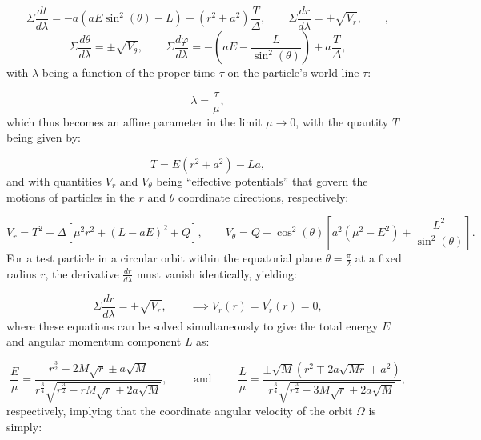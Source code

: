 \documentclass{article}
\begin{document}
\begin{equation}
\Sigma \frac{d t}{d \lambda} = -a \left( a E \sin^2 \left( \theta \right) - L \right) + \left( r^2 + a^2 \right) \frac{T}{\Delta}, \qquad \Sigma \frac{d r}{d \lambda} = \pm \sqrt{V_r}, \qquad,
\end{equation}
\begin{equation}
\Sigma \frac{d \theta}{d \lambda} = \pm \sqrt{V_{\theta}}, \qquad \Sigma \frac{d \varphi}{d \lambda} = - \left( a E - \frac{L}{\sin^2 \left( \theta \right)} \right) + a \frac{T}{\Delta},
\end{equation}
with ${\lambda}$ being a function of the proper time ${\tau}$ on the particle's world line ${\tau}$:

\begin{equation}
\lambda = \frac{\tau}{\mu},
\end{equation}
which thus becomes an affine parameter in the limit ${\mu \to 0}$, with the quantity $T$ being given by:

\begin{equation}
T = E \left( r^2 + a^2 \right) - L a,
\end{equation}
and with quantities ${V_r}$ and ${V_{\theta}}$ being ``effective potentials'' that govern the motions of particles in the $r$ and ${\theta}$ coordinate directions, respectively:

\begin{equation}
V_r = T^2 - \Delta \left[ \mu^2 r^2 + \left( L - a E \right)^2 + Q \right], \qquad V_{\theta} = Q - \cos^2 \left( \theta \right) \left[ a^2 \left( \mu^2 - E^2 \right) + \frac{L^2}{\sin^2 \left( \theta \right)} \right].
\end{equation}
For a test particle in a circular orbit within the equatorial plane ${\theta = \frac{\pi}{2}}$ at a fixed radius $r$, the derivative ${\frac{dr}{d \lambda}}$ must vanish identically, yielding:

\begin{equation}
\Sigma \frac{dr}{d \lambda} = \pm \sqrt{V_r}, \qquad \implies V_r \left( r \right) = V_{r}^{\prime} \left( r \right) = 0,
\end{equation}
where these equations can be solved simultaneously to give the total energy $E$ and angular momentum component $L$ as:

\begin{equation}
\frac{E}{\mu} = \frac{r^{\frac{3}{2}} - 2 M \sqrt{r} \pm a \sqrt{M}}{r^{\frac{3}{4}} \sqrt{r^{\frac{3}{2}} - r M \sqrt{r} \pm 2 a \sqrt{M}}}, \qquad \text{ and } \qquad \frac{L}{\mu} = \frac{\pm \sqrt{M} \left( r^2 \mp 2 a \sqrt{M r} + a^2 \right)}{r^{\frac{3}{4}} \sqrt{r^{\frac{3}{2}} - 3 M \sqrt{r} \pm 2 a \sqrt{M}}},
\end{equation}
respectively, implying that the coordinate angular velocity of the orbit ${\Omega}$ is simply:
\end{document}
